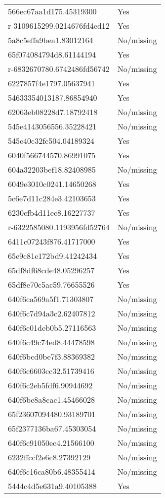 \begin{tabular}{ll}
566ec67aa1d175.45319300 & Yes \\
r-3109615299.0214676fd4ed12 & Yes \\
5a8c5effa9bea1.83012164 & No/missing \\
65f074084794d8.61144194 & Yes \\
r-6832670780.6742486fd56742 & No/missing \\
6227857f4e1797.05637941 & Yes \\
54633354013187.86854940 & Yes \\
62063eb08228d7.18792418 & No/missing \\
545e4143056556.35228421 & No/missing \\
545e40c32fc504.04189324 & Yes \\
6040f566744570.86991075 & Yes \\
604a32203bef18.82408985 & No/missing \\
6049e3010c0241.14650268 & Yes \\
5c6e7d11c284e3.42103653 & Yes \\
6230cfb4d11ec8.16227737 & Yes \\
r-6322585080.1193956fd52764 & No/missing \\
6411c07243f876.41717000 & Yes \\
65e9c81e172bd9.41242434 & Yes \\
65df8df68cde48.05296257 & Yes \\
65df8e70c5ac59.76655526 & Yes \\
640f6ca569a5f1.71303807 & No/missing \\
640f6c7d94a3c2.62407812 & No/missing \\
640f6c01deb0b5.27116563 & No/missing \\
640f6c49c74ed8.44478598 & No/missing \\
640f6bcd0be7f3.88369382 & No/missing \\
640f6c6603cc32.51739416 & No/missing \\
640f6c2eb5fdf6.90944692 & No/missing \\
640f6be8a8cac1.45466028 & No/missing \\
65f23607094480.93189701 & No/missing \\
65f2377136ba67.45303054 & No/missing \\
640f6c91050ec4.21566100 & No/missing \\
6232ffccf2e6c8.27392129 & No/missing \\
640f6c16ca80b6.48355414 & No/missing \\
5444c4d5e631a9.40105388 & Yes \\

\end{tabular}
